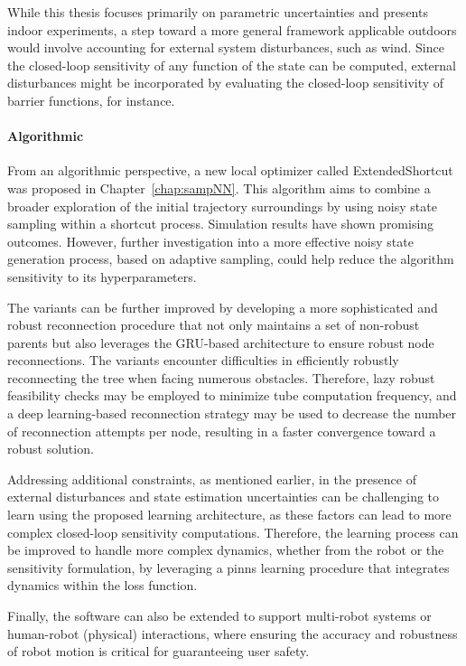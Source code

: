 While this thesis focuses primarily on parametric uncertainties and presents indoor experiments, a step toward a more general framework applicable outdoors would involve accounting for external system disturbances, such as wind.
Since the closed-loop sensitivity of any function of the state can be computed, external disturbances might be incorporated by evaluating the closed-loop sensitivity of barrier functions, for instance.

\paragraph{Algorithmic}

From an algorithmic perspective, a new local optimizer called ExtendedShortcut was proposed in Chapter~\ref{chap:sampNN}. 
This algorithm aims to combine a broader exploration of the initial trajectory surroundings by using noisy state sampling within a shortcut process. 
Simulation results have shown promising outcomes. 
However, further investigation into a more effective noisy state generation process, based on adaptive sampling, could help reduce the algorithm sensitivity to its hyperparameters.

The  variants can be further improved by developing a more sophisticated and robust reconnection procedure that not only maintains a set of non-robust parents but also leverages the GRU-based architecture to ensure robust node reconnections.
The  variants encounter difficulties in efficiently robustly reconnecting the tree when facing numerous obstacles. 
Therefore, lazy robust feasibility checks may be employed to minimize tube computation frequency, and a deep learning-based reconnection strategy may be used to decrease the number of reconnection attempts per node, resulting in a faster convergence toward a robust solution.

Addressing additional constraints, as mentioned earlier, in the presence of external disturbances and state estimation uncertainties can be challenging to learn using the proposed learning architecture, as these factors can lead to more complex closed-loop sensitivity computations.
Therefore, the learning process can be improved to handle more complex dynamics, whether from the robot or the sensitivity formulation, by leveraging a \gls{pinns} learning procedure that integrates  dynamics within the loss function.

Finally, the software can also be extended to support multi-robot systems or human-robot (physical) interactions, where ensuring the accuracy and robustness of robot motion is critical for guaranteeing user safety.
